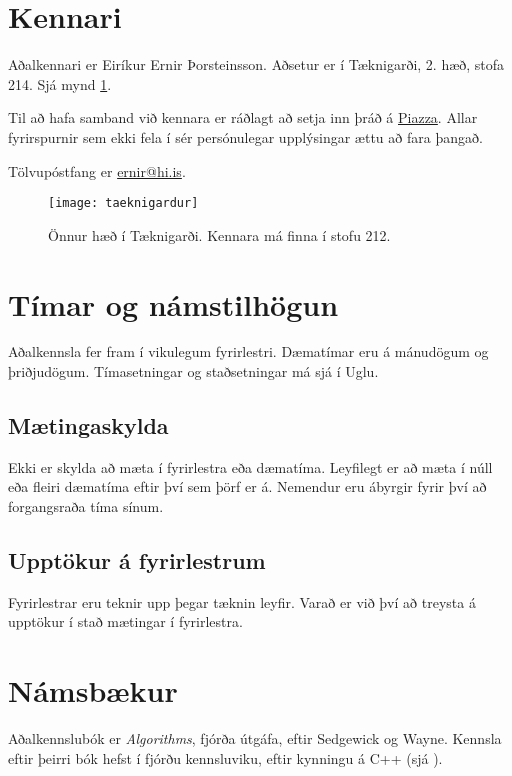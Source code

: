 \documentclass{article}
\begin{document}
\section{Kennari}
Aðalkennari er Eiríkur Ernir Þorsteinsson. Aðsetur er í Tæknigarði, 2. hæð, stofa 214. Sjá mynd \ref{fig:taeknigardur}.

Til að hafa samband við kennara er ráðlagt að setja inn þráð á \href{https://piazza.com/hi.is/spring2018/tl203g}{Piazza}. Allar fyrirspurnir sem ekki fela í sér persónulegar upplýsingar ættu að fara þangað. 

Tölvupóstfang er \href{mailto:ernir@hi.is}{ernir@hi.is}.

\begin{figure}
\caption{Önnur hæð í Tæknigarði. Kennara má finna í stofu 212.}
\label{fig:taeknigardur}
\begin{center}
\texttt{[image: taeknigardur]}
\end{center}
\end{figure}

\section{Tímar og námstilhögun}
Aðalkennsla fer fram í vikulegum fyrirlestri. Dæmatímar eru á mánudögum og þriðjudögum. Tímasetningar og staðsetningar má sjá í Uglu.

\subsection{Mætingaskylda}
Ekki er skylda að mæta í fyrirlestra eða dæmatíma. Leyfilegt er að mæta í núll eða fleiri dæmatíma eftir því sem þörf er á. Nemendur eru ábyrgir fyrir því að forgangsraða tíma sínum.

\subsection{Upptökur á fyrirlestrum}
Fyrirlestrar eru teknir upp þegar tæknin leyfir. Varað er við því að treysta á upptökur í stað mætingar í fyrirlestra.

\section{Námsbækur}
Aðalkennslubók er \emph{Algorithms}, fjórða útgáfa, eftir Sedgewick og Wayne. Kennsla eftir þeirri bók hefst í fjórðu kennsluviku, eftir kynningu á C++ (sjá ). 
\end{document}
